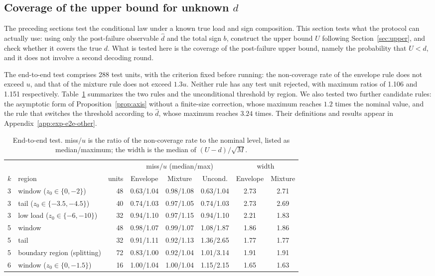 \subsection{Coverage of the upper bound for unknown $d$}\label{sec:e2e}
The preceding sections test the conditional law under a known true load and sign composition. This section tests what the protocol can actually use: using only the post-failure observable
$\widehat d$ and the total sign $b$, construct the upper bound $U$ following Section~\ref{sec:upper}, and check whether it covers the true $d$.
What is tested here is the coverage of the post-failure upper bound, namely the probability that $U<d$, and it does not involve a second decoding round.

The end-to-end test comprises 288 test units, with the criterion fixed before running: the non-coverage rate of the envelope rule does not exceed $u$, and that of the mixture rule does not exceed $1.3u$.
Neither rule has any test unit rejected, with maximum ratios of 1.106 and 1.151 respectively. Table~\ref{tab:e2e} summarizes the two rules and the
unconditional threshold by region. We also tested two further candidate rules: the asymptotic form of Proposition~\ref{prop:axis} without a
finite-size correction, whose maximum reaches $1.2$ times the nominal value, and the rule that switches the threshold according to
$\widehat d$, whose maximum reaches $3.24$ times. Their definitions and results appear in Appendix~\ref{app:exp-e2e-other}.

\begin{table}[!htbp]
\centering
\caption{End-to-end test. miss$/u$ is the ratio of the non-coverage rate to the nominal level, listed as median/maximum; the width is the median of $(U-d)/\sqrt M$.}
\label{tab:e2e}
\small
\setlength{\tabcolsep}{4pt}
\begin{tabular}{llrccccc}
\toprule
 & & & \multicolumn{3}{c}{miss$/u$ (median/max)} & \multicolumn{2}{c}{width}\\
\cmidrule(lr){4-6}\cmidrule(lr){7-8}
$k$ & region & units & Envelope & Mixture & Uncond. & Envelope & Mixture\\
\midrule
3 & window ($z_0\in\{0,-2\}$) & 48 & 0.63/1.04 & 0.98/1.08 & 0.63/1.04 & 2.73 & 2.71\\
3 & tail ($z_0\in\{-3.5,-4.5\}$) & 40 & 0.74/1.03 & 0.97/1.05 & 0.74/1.03 & 2.73 & 2.69\\
3 & low load ($z_0\in\{-6,-10\}$) & 32 & 0.94/1.10 & 0.97/1.15 & 0.94/1.10 & 2.21 & 1.83\\
5 & window & 48 & 0.98/1.07 & 0.99/1.07 & 1.08/1.87 & 1.86 & 1.86\\
5 & tail & 32 & 0.91/1.11 & 0.92/1.13 & 1.36/2.65 & 1.77 & 1.77\\
5 & boundary region (splitting) & 72 & 0.83/1.00 & 0.92/1.04 & 1.01/3.14 & 1.91 & 1.91\\
6 & window ($z_0\in\{0,-1.5\}$) & 16 & 1.00/1.04 & 1.00/1.04 & 1.15/2.15 & 1.65 & 1.63\\
\bottomrule
\end{tabular}
\end{table}

